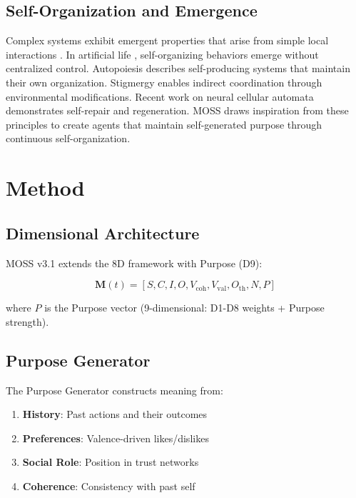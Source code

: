 \documentclass{article}
\begin{document}
\subsection{Self-Organization and Emergence}

Complex systems exhibit emergent properties that arise from simple local interactions \citep{holland1998emergence, johnson2001emergence}. In artificial life \citep{langton1997artificial, bedau2003artificial}, self-organizing behaviors emerge without centralized control. Autopoiesis \citep{maturana1980autopoiesis, varela1974autopoiesis} describes self-producing systems that maintain their own organization. Stigmergy \citep{theraulaz1999brief, marsh2006stigmergic} enables indirect coordination through environmental modifications. Recent work on neural cellular automata \citep{mordvintsev2020growing} demonstrates self-repair and regeneration. MOSS draws inspiration from these principles to create agents that maintain self-generated purpose through continuous self-organization.

\section{Method}

\subsection{Dimensional Architecture}

MOSS v3.1 extends the 8D framework with Purpose (D9):

\begin{equation}
    \mathbf{M}(t) = [S, C, I, O, V_{\text{coh}}, V_{\text{val}}, O_{\text{th}}, N, P]
\end{equation}

where $P$ is the Purpose vector (9-dimensional: D1-D8 weights + Purpose strength).

\subsection{Purpose Generator}

The Purpose Generator constructs meaning from:

\begin{enumerate}
    \item \textbf{History}: Past actions and their outcomes
    \item \textbf{Preferences}: Valence-driven likes/dislikes
    \item \textbf{Social Role}: Position in trust networks
    \item \textbf{Coherence}: Consistency with past self
\end{enumerate}
\end{document}

